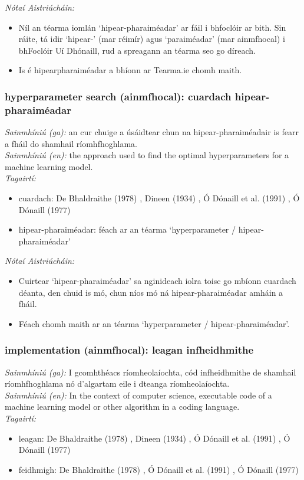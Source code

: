  \noindent \textit{Nótaí Aistriúcháin:}
\begin{itemize}
	\item Níl an téarma iomlán `hipear-pharaiméadar' ar fáil i bhfoclóir ar bith. Sin ráite, tá idir `hipear-' (mar réimír) agus `paraiméadar' (mar ainmfhocal) i bhFoclóir Uí Dhónaill, rud a spreagann an téarma seo go díreach.
	\item Is é hipearpharaiméadar a bhíonn ar Tearma.ie chomh maith.
\end{itemize}


\subsubsection*{hyperparameter search (ainmfhocal): cuardach hipear-pharaiméadar}
 \noindent \textit{Sainmhíniú (ga):} an cur chuige a úsáidtear chun na hipear-pharaiméadair is fearr a fháil do shamhail ríomhfhoghlama.
\\
 \noindent \textit{Sainmhíniú (en):} the approach used to find the optimal hyperparameters for a machine learning model.
\\
 \noindent \textit{Tagairtí:}
\begin{itemize}
	\item cuardach: De Bhaldraithe (1978) \cite{de-bhaldraithe}, Dineen (1934) \cite{dineen}, Ó Dónaill et al. (1991) \cite{focloir-beag}, Ó Dónaill (1977) \cite{odonaill}
	\item hipear-pharaiméadar: féach ar an téarma `hyperparameter / hipear-pharaiméadar'
\end{itemize}

 \noindent \textit{Nótaí Aistriúcháin:}
\begin{itemize}
	\item Cuirtear `hipear-pharaiméadar' sa nginideach iolra toisc go mbíonn cuardach déanta, den chuid is mó, chun níos mó ná hipear-pharaiméadar amháin a fháil.
	\item Féach chomh maith ar an téarma `hyperparameter / hipear-pharaiméadar'.
\end{itemize}


\subsubsection*{implementation (ainmfhocal): leagan infheidhmithe}
 \noindent \textit{Sainmhíniú (ga):} I gcomhthéacs ríomheolaíochta, cód infheidhmithe de shamhail ríomhfhoghlama nó d'algartam eile i dteanga ríomheolaíochta.
\\
 \noindent \textit{Sainmhíniú (en):} In the context of computer science, executable code of a machine learning model or other algorithm in a coding language.
\\
 \noindent \textit{Tagairtí:}
\begin{itemize}
	\item leagan: De Bhaldraithe (1978) \cite{de-bhaldraithe}, Dineen (1934) \cite{dineen}, Ó Dónaill et al. (1991) \cite{focloir-beag}, Ó Dónaill (1977) \cite{odonaill}
	\item feidhmigh: De Bhaldraithe (1978) \cite{de-bhaldraithe}, Ó Dónaill et al. (1991) \cite{focloir-beag}, Ó Dónaill (1977) \cite{odonaill}
\end{itemize}

